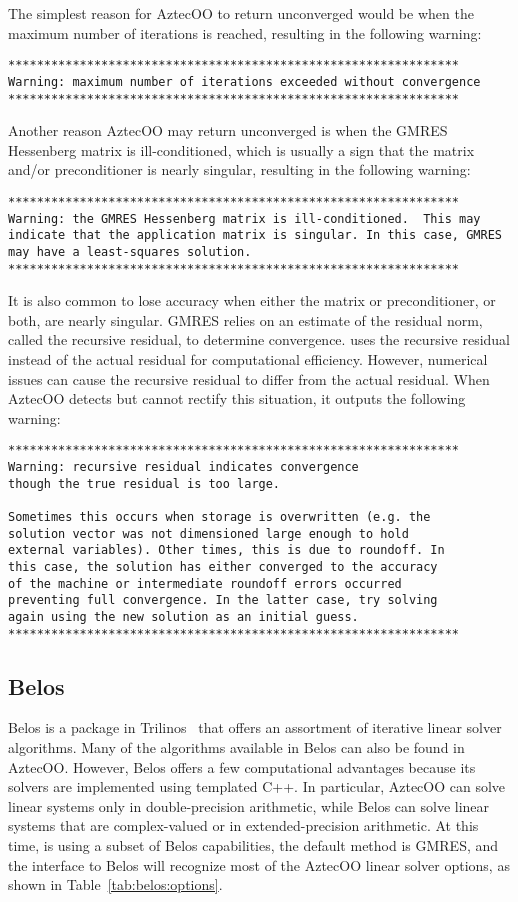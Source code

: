 The simplest reason for AztecOO to return unconverged would be when the maximum number of 
iterations is reached, resulting in the following warning:
\begin{verbatim}
***************************************************************
Warning: maximum number of iterations exceeded without convergence
***************************************************************
\end{verbatim}
Another reason AztecOO may return unconverged is when the GMRES Hessenberg
matrix is ill-conditioned, which is usually a sign that the matrix and/or
preconditioner is nearly singular, resulting in the following warning:
\begin{verbatim}
***************************************************************
Warning: the GMRES Hessenberg matrix is ill-conditioned.  This may
indicate that the application matrix is singular. In this case, GMRES
may have a least-squares solution.
***************************************************************
\end{verbatim}
It is also common to lose accuracy when either the matrix or preconditioner, or both,
are nearly singular.  GMRES relies on an estimate of the residual norm,
called the recursive residual, to determine convergence.  \Xyce{} uses the recursive
residual instead of the actual residual for computational efficiency.
However, numerical issues can cause the recursive residual to differ
from the actual residual.  When AztecOO detects but
cannot rectify this situation, it outputs the following warning:
\begin{verbatim}
***************************************************************
Warning: recursive residual indicates convergence
though the true residual is too large.

Sometimes this occurs when storage is overwritten (e.g. the
solution vector was not dimensioned large enough to hold
external variables). Other times, this is due to roundoff. In
this case, the solution has either converged to the accuracy
of the machine or intermediate roundoff errors occurred
preventing full convergence. In the latter case, try solving
again using the new solution as an initial guess.
***************************************************************
\end{verbatim}

\subsection{Belos}
\label{Belos_Options}
Belos is a package in Trilinos~\cite{trilinos:toms} that offers an assortment of iterative linear
solver algorithms.  Many of the algorithms available in Belos can also be found in AztecOO.  However, Belos
offers a few computational advantages because its solvers are implemented using templated C++.  
In particular, AztecOO can solve linear systems only in double-precision arithmetic, while Belos
can solve linear systems that are complex-valued or in extended-precision arithmetic.  At this time,
\Xyce{} is using a subset of Belos capabilities, the default method is GMRES, and the 
interface to Belos will recognize most of the AztecOO linear solver options, as shown in 
Table~\ref{tab:belos:options}.

